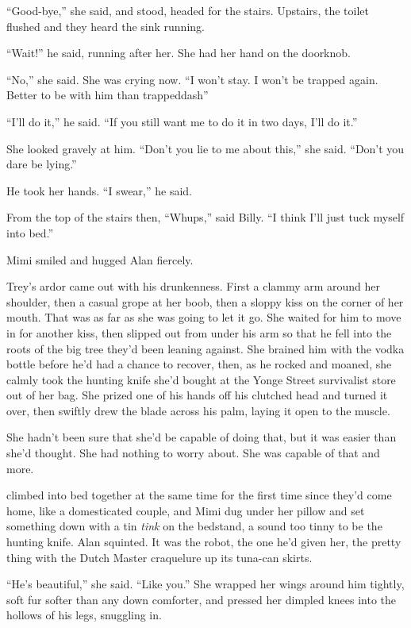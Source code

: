 ``Good-bye,'' she said, and stood, headed for the stairs.  Upstairs,
the toilet flushed and they heard the sink running.

``Wait!'' he said, running after her.  She had her hand on the
doorknob.

``No,'' she said.  She was crying now.  ``I won't stay.  I won't be
trapped again.  Better to be with him than trappeddash{}''

``I'll do it,'' he said.  ``If you still want me to do it in two days,
I'll do it.''

She looked gravely at him.  ``Don't you lie to me about this,'' she
said.  ``Don't you dare be lying.''

He took her hands.  ``I swear,'' he said.

From the top of the stairs then, ``Whups,'' said Billy.  ``I think
I'll just tuck myself into bed.''

Mimi smiled and hugged Alan fiercely.

Trey's ardor came out with his drunkenness.  First a clammy arm around
her shoulder, then a casual grope at her boob, then a sloppy kiss on
the corner of her mouth.  That was as far as she was going to let it
go.  She waited for him to move in for another kiss, then slipped out
from under his arm so that he fell into the roots of the big tree
they'd been leaning against.  She brained him with the vodka bottle
before he'd had a chance to recover, then, as he rocked and moaned,
she calmly took the hunting knife she'd bought at the Yonge Street
survivalist store out of her bag.  She prized one of his hands off his
clutched head and turned it over, then swiftly drew the blade across
his palm, laying it open to the muscle.

She hadn't been sure that she'd be capable of doing that, but it was
easier than she'd thought.  She had nothing to worry about.  She was
capable of that and more.

 climbed into bed together at the same time for the first time
since they'd come home, like a domesticated couple, and Mimi dug under
her pillow and set something down with a tin \textit{tink} on the
bedstand, a sound too tinny to be the hunting knife.  Alan squinted. 
It was the robot, the one he'd given her, the pretty thing with the
Dutch Master craquelure up its tuna-can skirts.

``He's beautiful,'' she said.  ``Like you.'' She wrapped her wings
around him tightly, soft fur softer than any down comforter, and
pressed her dimpled knees into the hollows of his legs, snuggling in.


